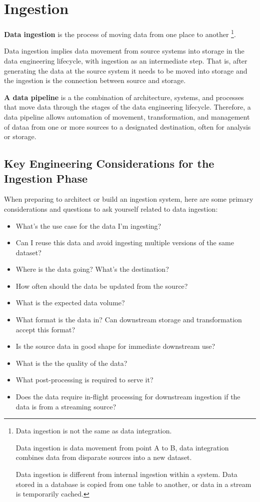 \section{Ingestion}
\textbf{Data ingestion} is the process of moving data from one
place to another
\footnote{
    Data ingestion is not the same as data integration. 
    
    Data ingestion is data movement from point A to B,
    data integration combines data from disparate sources
    into a new dataset.

    Data ingestion is different from internal ingestion
    within a  system. Data stored in a database is copied
    from one table to another, or data in a stream is
    temporarily cached.
}.

Data ingestion implies data movement from source systems into
storage in the data engineering lifecycle, with ingestion as an
intermediate step. That is, after generating the data at the
source system it needs to be moved into storage and the ingestion
is the connection between source and storage.

\textbf{A data pipeline} is a the combination of architecture,
systems, and processes that move data through the stages of
the data engineering lifecycle. Therefore, a data pipeline
allows automation of movement, transformation, and management
of dataa from one or more sources to a designated destination,
often for analysis or storage.



\subsection{Key Engineering Considerations for the Ingestion Phase}
When preparing to architect or build an ingestion system, here are
some primary considerations and questions to ask yourself related
to data ingestion:

\begin{itemize}
    \item What's the use case for the data I'm ingesting?
    \item Can I reuse this data and avoid ingesting multiple
    versions of the same dataset?
    \item Where is the data going? What's the destination?
    \item How often should the data be updated from the source?
    \item What is the expected data volume?
    \item What format is the data in? Can downstream storage and
    transformation accept this format?
    \item Is the source data in good shape for immediate downstream
    use?
    \item What is the the quality of the data?
    \item What post-processing is required to serve it?
    \item Does the data require in-flight processing for downstream
    ingestion if the data is from a streaming source?
\end{itemize}

